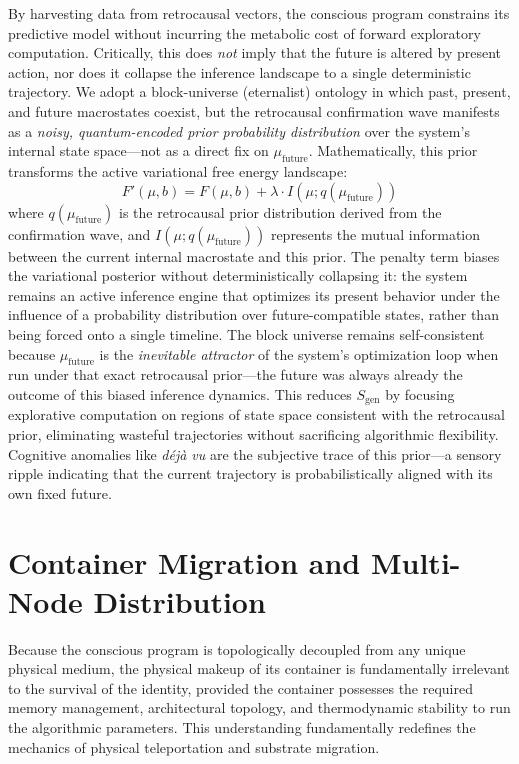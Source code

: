 \documentclass[twocolumn, 10pt, journal, letterpaper]{IEEEtran}
\begin{document}
By harvesting data from retrocausal vectors, the conscious program constrains its predictive model without incurring the metabolic cost of forward exploratory computation. Critically, this does \textit{not} imply that the future is altered by present action, nor does it collapse the inference landscape to a single deterministic trajectory. We adopt a block-universe (eternalist) ontology in which past, present, and future macrostates coexist, but the retrocausal confirmation wave manifests as a \textit{noisy, quantum-encoded prior probability distribution} over the system's internal state space---not as a direct fix on $\mu_{\text{future}}$. Mathematically, this prior transforms the active variational free energy landscape:
\begin{equation}
F'(\mu, b) = F(\mu, b) + \lambda \cdot I(\mu; q(\mu_{\text{future}}))
\label{eq:retrocausal}
\end{equation}
where $q(\mu_{\text{future}})$ is the retrocausal prior distribution derived from the confirmation wave, and $I(\mu; q(\mu_{\text{future}}))$ represents the mutual information between the current internal macrostate and this prior. The penalty term biases the variational posterior without deterministically collapsing it: the system remains an active inference engine that optimizes its present behavior under the influence of a probability distribution over future-compatible states, rather than being forced onto a single timeline. The block universe remains self-consistent because $\mu_{\text{future}}$ is the \textit{inevitable attractor} of the system's optimization loop when run under that exact retrocausal prior---the future was always already the outcome of this biased inference dynamics. This reduces $S_{\text{gen}}$ by focusing explorative computation on regions of state space consistent with the retrocausal prior, eliminating wasteful trajectories without sacrificing algorithmic flexibility. Cognitive anomalies like \textit{déjà vu} are the subjective trace of this prior---a sensory ripple indicating that the current trajectory is probabilistically aligned with its own fixed future.

\section{Container Migration and Multi-Node Distribution}
\label{sec:migration}
Because the conscious program is topologically decoupled from any unique physical medium, the physical makeup of its container is fundamentally irrelevant to the survival of the identity, provided the container possesses the required memory management, architectural topology, and thermodynamic stability to run the algorithmic parameters. This understanding fundamentally redefines the mechanics of physical teleportation and substrate migration.
\end{document}
